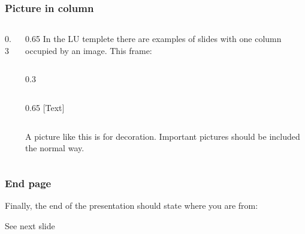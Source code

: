 \documentclass[aspectratio=1610]{beamer}
\begin{document}
\begin{frame}[fragile]
  \frametitle{Picture in column}
  \begin{columns}[onlytextwidth]
    \begin{column}[c]{0.3\linewidth}
    \end{column}%
    \begin{column}[c]{0.65\linewidth}
      In the LU templete there are examples of slides with one column occupied by an image. This frame:
\begin{CodeBox}{}
\begin{columns}[onlytextwidth]
  \begin{column}{0.3\textwidth}
  \end{column}
\end{columns}%
\begin{column}{0.65\textwidth}
  [Text]
\end{column}
\end{CodeBox}      
A picture like this is for decoration. Important pictures should be included the normal way.
\end{column}
\end{columns}
\end{frame}



\begin{frame}[fragile]
  \frametitle{End page}
  Finally, the end of the presentation should state where you are from:
\begin{CodeBox}{}
\begin{frame}[plain]
  \endpage
\end{frame}%
\end{CodeBox}
  See next slide
\end{frame}

\begin{frame}[plain]
  \endpage
\end{frame}

\end{document}
